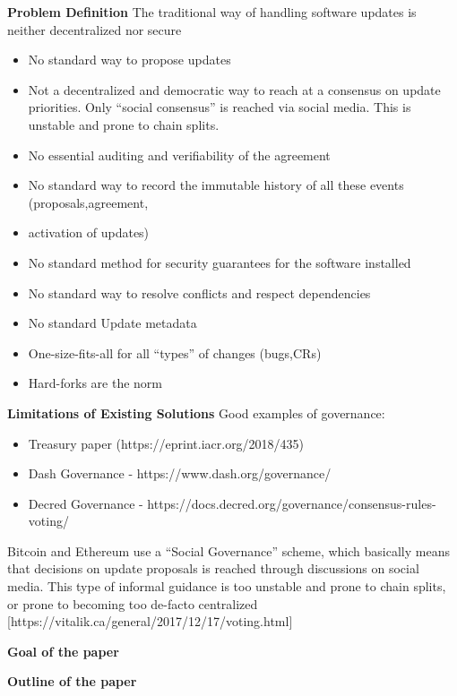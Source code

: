 \noindent\textbf{Problem Definition}
The traditional way of handling software updates is neither decentralized nor secure
\begin{itemize}
\item No standard way to propose updates
\item Not a decentralized and democratic way to reach at a consensus on update priorities. Only \enquote{social consensus} is reached via social media. This is unstable and prone to chain splits.
\item No essential auditing and verifiability of the agreement
\item No standard way to record the immutable history of all these events (proposals,agreement, \item activation of updates)
\item No standard method for security guarantees for the software installed
\item No standard way to resolve conflicts and respect dependencies 
\item No standard Update metadata
\item One-size-fits-all for all \enquote{types} of changes (bugs,CRs)
\item Hard-forks are the norm
\end{itemize}

\noindent\textbf{Limitations of Existing Solutions}
Good examples of governance:
\begin{itemize}
\item Treasury paper (https://eprint.iacr.org/2018/435)
\item Dash Governance  - https://www.dash.org/governance/ 
\item Decred Governance - https://docs.decred.org/governance/consensus-rules-voting/

\end{itemize}

Bitcoin and Ethereum use a \enquote{Social Governance} scheme, which basically means that decisions on update proposals is reached through discussions on social media. This type of informal guidance is  too unstable and prone to chain splits, or prone to becoming too de-facto centralized [https://vitalik.ca/general/2017/12/17/voting.html]

\noindent\textbf{Goal of the paper}

\noindent\textbf{Outline of the paper}